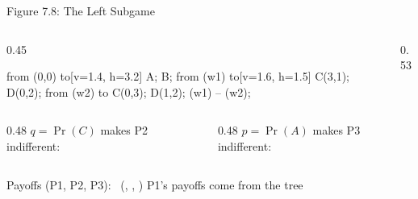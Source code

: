 \begin{frame}{Figure 7.8: The Left Subgame}
\begin{columns}[c]
    \begin{column}{0.45\textwidth}
        \centering
        {%
        \begin{gametree}[player names={2, 3}]
          \branch[player=1, root=w, label=90] from (0,0) to[v=1.4, h=3.2] {A; B};
          \branch[player=2, label=none] from (w1) to[v=1.6, h=1.5] {C(3,1); D(0,2)};
          \branch[label=none] from (w2) to {C(0,3); D(1,2)};
          \informset[player=2] (w1) -- (w2);
        \end{gametree}}
    \end{column}
    \begin{column}{0.53\textwidth}
        \centering
        {%
        \begin{matrixgame}[top={C, D}, left={A, B}, player names={Player 2, Player 3}]
        \end{matrixgame}}
    \end{column}
\end{columns}
\bsk
\begin{columns}[T]
\begin{column}{0.48\textwidth}
$q=\Pr(C)$ makes P2 indifferent:\\[4pt]
\end{column}
\begin{column}{0.48\textwidth}
$p=\Pr(A)$ makes P3 indifferent:\\[4pt]
\end{column}
\end{columns}
\vspace{0.25in}

Payoffs (P1, P2, P3): \ (, , ) \hfill {\footnotesize P1's payoffs come from the tree}
\vspace{-0.3in}
\end{frame}

